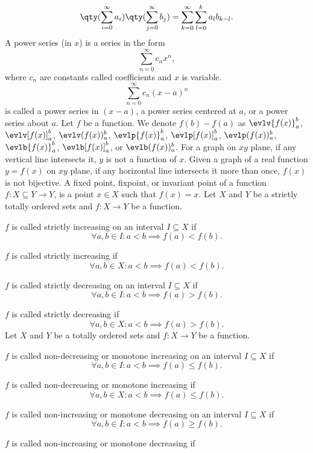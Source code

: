 \documentclass[a4paper,12pt]{article}
\begin{document}
\[\qty(\sum_{i=0}^{\infty}a_i)\qty(\sum_{j=0}^{\infty}b_j)=\sum_{k=0}^{\infty}\sum_{l=0}^ka_lb_{k-l}.\]
A power series (in $x$) is a series in the form
\[\sum_{n=0}^{\infty}c_nx^n,\]
where $c_n$ are constants called coefficients and $x$ is variable.
\[\sum_{n=0}^{\infty}c_n(x-a)^n\]
is called a power series in $(x-a)$, a power series centered at $a$, or a power series about $a$.
Let $f$ be a function. We denote $f(b)-f(a)$ as $\evlv{f(x)}_a^b$, $\evlv[f(x)]_a^b$, $\evlv(f(x))_a^b$, $\evlp{f(x)}_a^b$, $\evlp[f(x)]_a^b$, $\evlp(f(x))_a^b$, $\evlb{f(x)}_a^b$, $\evlb[f(x)]_a^b$, or $\evlb(f(x))_a^b$.
For a graph on $xy$ plane, if any vertical line intersects it, $y$ is not a function of $x$.
Given a graph of a real function $y=f(x)$ on $xy$ plane, if any horizontal line intersects it more than once, $f(x)$ is not bijective.
A fixed point, fixpoint, or invariant point of a function $f\colon X\subseteq Y\to Y$, is a point $x\in X$ such that $f(x)=x$.
Let $X$ and $Y$ be a strictly totally ordered sets and $f\colon X\to Y$ be a function.
\bit
\item $f$ is called strictly increasing on an interval $I\subseteq X$ if
\[\forall a,b\in I\colon a<b\implies f(a)<f(b).\]
\item $f$ is called strictly increasing if
\[\forall a,b\in X\colon a<b\implies f(a)<f(b).\]
\item $f$ is called strictly decreasing on an interval $I\subseteq X$ if
\[\forall a,b\in I\colon a<b\implies f(a)>f(b).\]
\item $f$ is called strictly decreasing if
\[\forall a,b\in X\colon a<b\implies f(a)>f(b).\]
\eit
Let $X$ and $Y$ be a totally ordered sets and $f\colon X\to Y$ be a function.
\bit
\item $f$ is called non-decreasing or monotone increasing on an interval $I\subseteq X$ if
\[\forall a,b\in I\colon a<b\implies f(a)\leq f(b).\]
\item $f$ is called non-decreasing or monotone increasing if
\[\forall a,b\in X\colon a<b\implies f(a)\leq f(b).\]
\item $f$ is called non-increasing or monotone decreasing on an interval $I\subseteq X$ if
\[\forall a,b\in I\colon a<b\implies f(a)\geq f(b).\]
\item $f$ is called non-increasing or monotone decreasing if
\end{document}
